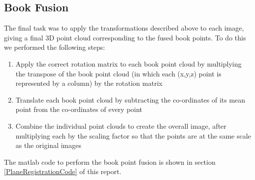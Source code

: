 \subsection{Book Fusion}

The final task was to apply the transformations described above to each image, giving a final 3D point cloud corresponding to the fused book points. To do this we performed the following steps:

\begin{enumerate}
	\item Apply the correct rotation matrix to each book point cloud by multiplying the transpose of the book point cloud (in which each (x,y,z) point is represented by a column) by the rotation matrix
	\item Translate each book point cloud by subtracting the co-ordinates of its mean point from the co-ordinates of every point
	\item Combine the individual point clouds to create the overall image, after multiplying each by the scaling factor so that the points are at the same scale as the original images
\end{enumerate}

The matlab code to perform the book point fusion is shown in section \ref{PlaneRegistrationCode} of this report.





